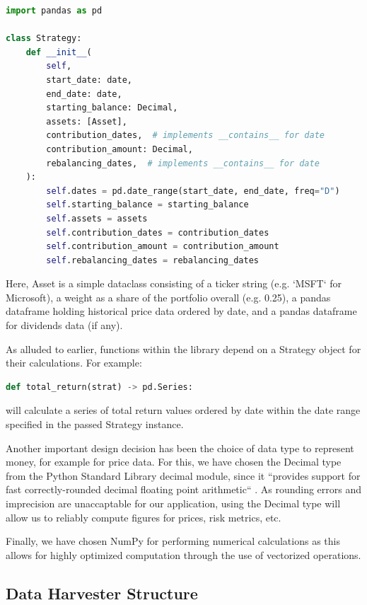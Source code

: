 \documentclass[main.tex]{subfiles}
\begin{document}
\begin{lstlisting}[language=Python, caption=setup.py - Development environment, label=lst:Development_env]
import pandas as pd

class Strategy:
    def __init__(
        self,
        start_date: date,
        end_date: date,
        starting_balance: Decimal,
        assets: [Asset],
        contribution_dates,  # implements __contains__ for date
        contribution_amount: Decimal,
        rebalancing_dates,  # implements __contains__ for date
    ):
        self.dates = pd.date_range(start_date, end_date, freq="D")
        self.starting_balance = starting_balance
        self.assets = assets
        self.contribution_dates = contribution_dates
        self.contribution_amount = contribution_amount
        self.rebalancing_dates = rebalancing_dates
\end{lstlisting}

Here, Asset is a simple dataclass consisting of a ticker string (e.g. `MSFT` for Microsoft), a weight as a share of the portfolio overall (e.g. 0.25), a pandas dataframe holding historical price data ordered by date, and a pandas dataframe for dividends data (if any).

As alluded to earlier, functions within the library depend on a Strategy object for their calculations. For example:

\begin{lstlisting}[language=Python, caption=setup.py - Development environment, label=lst:Development_env]
def total_return(strat) -> pd.Series:
\end{lstlisting}
will calculate a series of total return values ordered by date within the date range specified in the passed Strategy instance.

Another important design decision has been the choice of data type to represent money, for example for price data. For this, we have chosen the Decimal type from the Python Standard Library decimal module, since it ``provides support for fast correctly-rounded decimal floating point arithmetic`` \cite{PyDecimal}. As rounding errors and imprecision are unaccaptable for our application, using the Decimal type will allow us to reliably compute figures for prices, risk metrics, etc.

Finally, we have chosen NumPy \cite{walt2011numpy} for performing numerical calculations as this allows for highly optimized computation through the use of vectorized operations.

\subsection{Data Harvester Structure}
\end{document}
